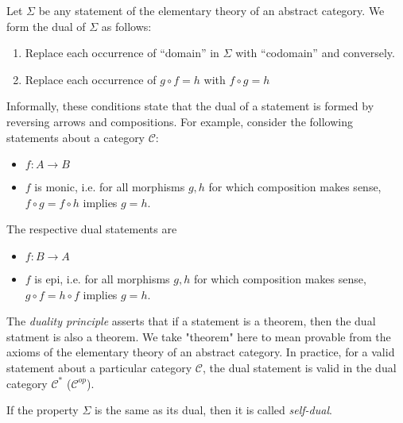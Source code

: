 \documentclass[12pt]{article}
\begin{document}
Let $\Sigma$ be any statement of the elementary theory of an abstract category. We form the dual of $\Sigma$ as follows:
\begin{enumerate}
\item Replace each occurrence of ``domain'' in $\Sigma$ with ``codomain'' and conversely.
\item Replace each occurrence of $g \circ f =h$ with $f \circ g = h$
\end{enumerate} 
Informally, these conditions state that the dual of a statement is formed by reversing arrows and compositions. For example, consider the following statements about a category $\mathcal{C}$:
\begin{itemize}
\item $f:A \to B$
\item $f$ is monic, i.e. for all morphisms $g,h$ for which composition makes sense, $f \circ g = f \circ h$ implies $g=h$.
\end{itemize}
The respective dual statements are
\begin{itemize}
\item $f:B \to A$
\item $f$ is epi, i.e. for all morphisms $g,h$ for which composition makes sense, $g \circ f = h \circ f$ implies $g=h$.
\end{itemize}
The \emph{duality principle} asserts that if a statement is a theorem, then the dual statment is also a theorem. We take "theorem" here to mean provable from the axioms of the elementary theory of an abstract category. In practice, for a valid statement about a particular category $\mathcal{C}$, the dual statement is valid in the dual category $\mathcal{C}^{*}$ ($\mathcal{C}^{op}$).

If the property $\Sigma$ is the same as its dual, then it is called \emph{self-dual}.
\end{document}
